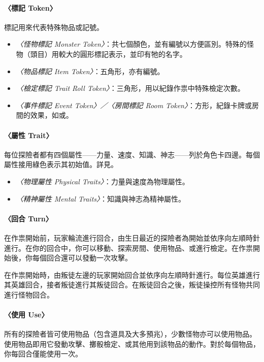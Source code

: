 \paragraph{〈標記 Token〉}
標記用來代表特殊物品或記號。

\begin{itemize}
	\item \textit{〈怪物標記 Monster Token〉}：共七個顏色，並有編號以方便區別。特殊的怪物（頭目）用較大的圓形標記表示，並印有牠的名字。
	\item \textit{〈物品標記 Item Token〉}：五角形，亦有編號。
	\item \textit{〈檢定標記 Trait Roll Token〉}：三角形，用以紀錄作祟中特殊檢定次數。
	\item \textit{〈事件標記 Event Token〉／〈房間標記 Room Token〉}：方形，紀錄卡牌或房間的效果，如或。
\end{itemize}

\paragraph{〈屬性 Trait〉}
每位探險者都有四個屬性——力量、速度、知識、神志——列於角色卡四邊。每個屬性接用綠色表示其初始值。詳見。

\begin{itemize}
	\item \textit{〈物理屬性 Physical Traits〉}：力量與速度為物理屬性。
	\item \textit{〈精神屬性 Mental Traits〉}：知識與神志為精神屬性。
\end{itemize}

\paragraph{〈回合 Turn〉}
在作祟開始前，玩家輪流進行回合，由生日最近的探險者為開始並依序向左順時針進行。在你的回合中，你可以移動、探索房間、使用物品、或進行檢定。在作祟開始後，你每個回合還可以發動一次攻擊。

在作祟開始時，由叛徒左邊的玩家開始回合並依序向左順時針進行。每位英雄進行其英雄回合，接者叛徒進行其叛徒回合。在叛徒回合之後，叛徒操控所有怪物共同進行怪物回合。

\paragraph{〈使用 Use〉}
所有的探險者皆可使用物品（包含道具及大多預兆），少數怪物亦可以使用物品。使用物品即用它發動攻擊、擲骰檢定、或其他用到該物品的動作。對於每個物品，你每回合僅能使用一次。

